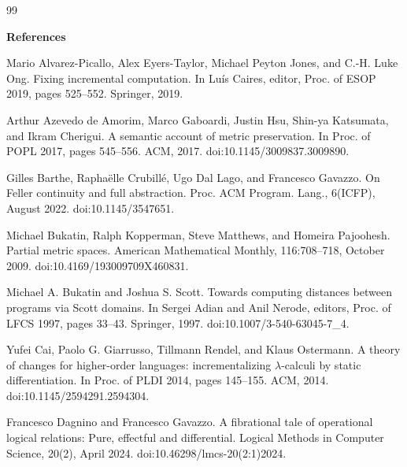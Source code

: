 \documentclass[10pt,a4paper]{amsart}
\begin{document}
 
 

\begin{thebibliography}{99}

 
\par\medskip\noindent\textbf{References}\par
  
\par\noindent  [1]  Mario Alvarez-Picallo, Alex Eyers-Taylor, Michael Peyton Jones, and C.-H. Luke Ong.  Fixing incremental computation.  In Luís Caires, editor, Proc. of ESOP 2019, pages 525–552. Springer, 2019.  
 
\par\noindent  [2]  Arthur Azevedo de Amorim, Marco Gaboardi, Justin Hsu, Shin-ya Katsumata, and Ikram Cherigui.  A semantic account of metric preservation.  In Proc. of POPL 2017, pages 545–556. ACM, 2017.  doi:10.1145/3009837.3009890.  
 
\par\noindent  [3]  Gilles Barthe, Raphaëlle Crubillé, Ugo Dal Lago, and Francesco Gavazzo.  On Feller continuity and full abstraction.  Proc. ACM Program. Lang., 6(ICFP), August 2022.  doi:10.1145/3547651.  
 
\par\noindent  [4]  Michael Bukatin, Ralph Kopperman, Steve Matthews, and Homeira Pajoohesh.  Partial metric spaces.  American Mathematical Monthly, 116:708–718, October 2009.  doi:10.4169/193009709X460831.  
 
\par\noindent  [5]  Michael A. Bukatin and Joshua S. Scott.  Towards computing distances between programs via Scott domains.  In Sergei Adian and Anil Nerode, editors, Proc. of LFCS 1997, pages 33–43. Springer, 1997.  doi:10.1007/3-540-63045-7\_4.  
 
\par\noindent  [6]  Yufei Cai, Paolo G. Giarrusso, Tillmann Rendel, and Klaus Ostermann.  A theory of changes for higher-order languages: incrementalizing $\lambda$-calculi by static differentiation.  In Proc. of PLDI 2014, pages 145–155. ACM, 2014.  doi:10.1145/2594291.2594304.  
 
\par\noindent  [7]  Francesco Dagnino and Francesco Gavazzo.  A fibrational tale of operational logical relations: Pure, effectful and differential.  Logical Methods in Computer Science, 20(2), April 2024.  doi:10.46298/lmcs-20(2:1)2024.  
 

\end{thebibliography}
\end{document}
